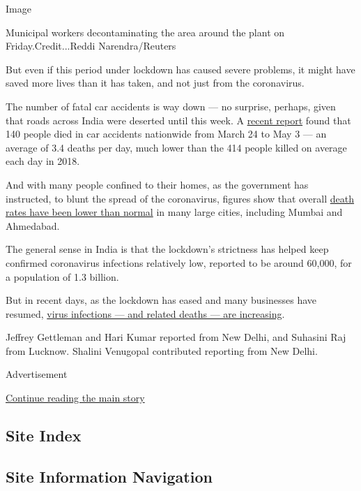 Image

Municipal workers decontaminating the area around the plant on
Friday.Credit...Reddi Narendra/Reuters

But even if this period under lockdown has caused severe problems, it
might have saved more lives than it has taken, and not just from the
coronavirus.

The number of fatal car accidents is way down --- no surprise, perhaps,
given that roads across India were deserted until this week. A
\href{https://indianexpress.com/article/india/road-accidents-during-india-lockdown-6397368/}{recent
report} found that 140 people died in car accidents nationwide from
March 24 to May 3 --- an average of 3.4 deaths per day, much lower than
the 414 people killed on average each day in 2018.

And with many people confined to their homes, as the government has
instructed, to blunt the spread of the coronavirus, figures show that
overall
\href{https://www.reuters.com/article/us-health-coronavirus-india-casualties/mortality-rates-drop-sharply-in-parts-of-india-bucking-coronavirus-trend-idUSKCN2260WM}{death
rates have been lower than normal} in many large cities, including
Mumbai and Ahmedabad.

The general sense in India is that the lockdown's strictness has helped
keep confirmed coronavirus infections relatively low, reported to be
around 60,000, for a population of 1.3 billion.

But in recent days, as the lockdown has eased and many businesses have
resumed,
\href{https://www.nytimes.com/2020/05/06/world/asia/india-coronavirus-lockdown-infections.html}{virus
infections --- and related deaths --- are increasing}.

Jeffrey Gettleman and Hari Kumar reported from New Delhi, and Suhasini
Raj from Lucknow. Shalini Venugopal contributed reporting from New
Delhi.

Advertisement

\protect\hyperlink{after-bottom}{Continue reading the main story}

\hypertarget{site-index}{%
\subsection{Site Index}\label{site-index}}

\hypertarget{site-information-navigation}{%
\subsection{Site Information
Navigation}\label{site-information-navigation}}


